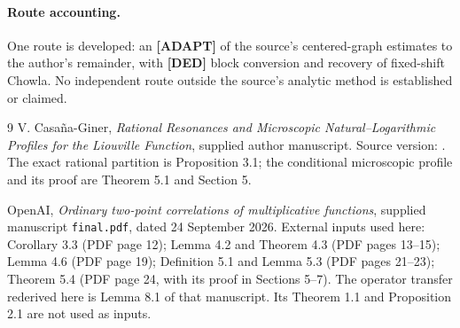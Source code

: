 \documentclass[11pt,a4paper]{article}
\numberwithin{equation}{section}
\theoremstyle{remark}\newtheorem{remark}[theorem]{Remark}
\newcommand{\1}{\mathbf 1}
\begin{document}
\paragraph{Route accounting.}
One route is developed: an \textbf{[ADAPT]} of the source's centered-graph
estimates to the author's remainder, with \textbf{[DED]} block conversion
and recovery of fixed-shift Chowla. No independent route outside the
source's analytic method is established or claimed.

\begin{thebibliography}{9}
V. Casa\~na-Giner,
\emph{Rational Resonances and Microscopic Natural--Logarithmic Profiles
for the Liouville Function}, supplied author manuscript.
Source version: .
The exact rational partition is Proposition 3.1; the conditional
microscopic profile and its proof are Theorem 5.1 and Section 5.

OpenAI, \emph{Ordinary two-point correlations of multiplicative functions},
supplied manuscript \texttt{final.pdf}, dated 24 September 2026.
External inputs used here: Corollary 3.3 (PDF page 12);
Lemma 4.2 and Theorem 4.3 (PDF pages 13--15);
Lemma 4.6 (PDF page 19); Definition 5.1 and Lemma 5.3
(PDF pages 21--23); Theorem 5.4 (PDF page 24, with its proof in
Sections 5--7). The operator transfer rederived here is Lemma 8.1
of that manuscript. Its Theorem 1.1 and Proposition 2.1 are not
used as inputs.
\end{thebibliography}
\end{document}
